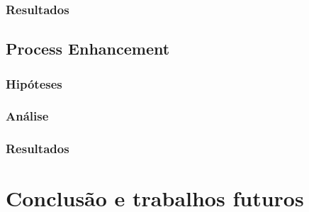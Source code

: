 \documentclass[a4paper]{article}
\begin{document}
\subsubsection{Resultados}
\lipsum[10]
\lipsum[10]
\lipsum[10]
\lipsum[10]

\subsection{Process Enhancement}

\lipsum[10]

\subsubsection{Hipóteses}
\lipsum[10]
\lipsum[10]
\lipsum[10]
\lipsum[10]
\subsubsection{Análise}
\lipsum[10]
\lipsum[10]
\lipsum[10]
\lipsum[10]
\subsubsection{Resultados}
\lipsum[10]
\lipsum[10]
\lipsum[10]
\lipsum[10]

\section{Conclusão e trabalhos futuros}

\lipsum[10]
\lipsum[10]
\lipsum[10]
\lipsum[10]
\lipsum[10]
\lipsum[10]
\lipsum[10]
\lipsum[10]
\lipsum[10]



\end{document}
